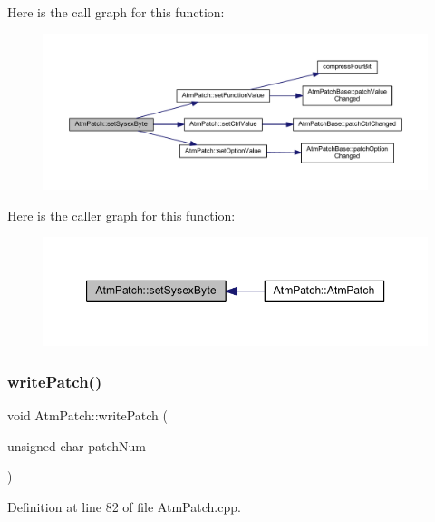Here is the call graph for this function\+:
\nopagebreak
\begin{figure}[H]
\begin{center}
\leavevmode
\includegraphics[width=350pt]{d9/de1/class_atm_patch_acc2729c3b10aa4d7f98e67caa3b80255_cgraph}
\end{center}
\end{figure}
Here is the caller graph for this function\+:
\nopagebreak
\begin{figure}[H]
\begin{center}
\leavevmode
\includegraphics[width=350pt]{d9/de1/class_atm_patch_acc2729c3b10aa4d7f98e67caa3b80255_icgraph}
\end{center}
\end{figure}
\mbox{\label{class_atm_patch_a5814cd528970cb153dd67865a6b86c85}} 
\subsubsection{\texorpdfstring{write\+Patch()}{writePatch()}}
{\footnotesize\ttfamily void Atm\+Patch\+::write\+Patch (\begin{DoxyParamCaption}\item[{unsigned char}]{patch\+Num }\end{DoxyParamCaption})}



Definition at line 82 of file Atm\+Patch.\+cpp.

